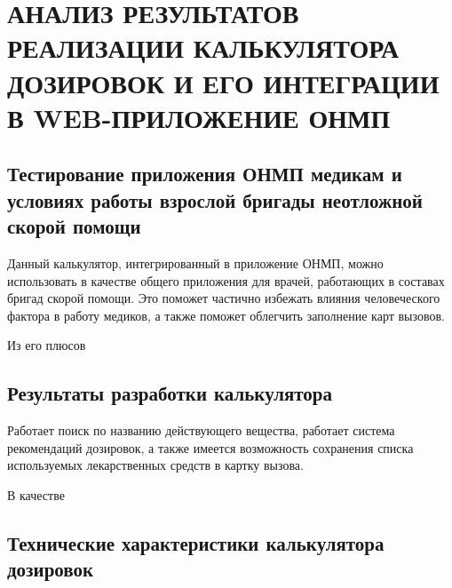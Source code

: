 \section{АНАЛИЗ РЕЗУЛЬТАТОВ РЕАЛИЗАЦИИ КАЛЬКУЛЯТОРА ДОЗИРОВОК И ЕГО ИНТЕГРАЦИИ В WEB-ПРИЛОЖЕНИЕ ОНМП}
\subsection{Тестирование приложения ОНМП медикам и условиях работы взрослой бригады неотложной скорой помощи}
Данный калькулятор, интегрированный в приложение ОНМП, можно использовать в качестве общего приложения для врачей, работающих в составах бригад скорой помощи. Это поможет частично избежать влияния человеческого фактора в работу медиков, а также поможет облегчить заполнение карт вызовов.

Из его плюсов 


\subsection{Результаты разработки калькулятора}
Работает поиск по названию действующего вещества, работает система рекомендаций дозировок, а также имеется возможность сохранения списка используемых лекарственных средств в картку вызова.

В качестве 

\subsection{Технические характеристики калькулятора дозировок}
